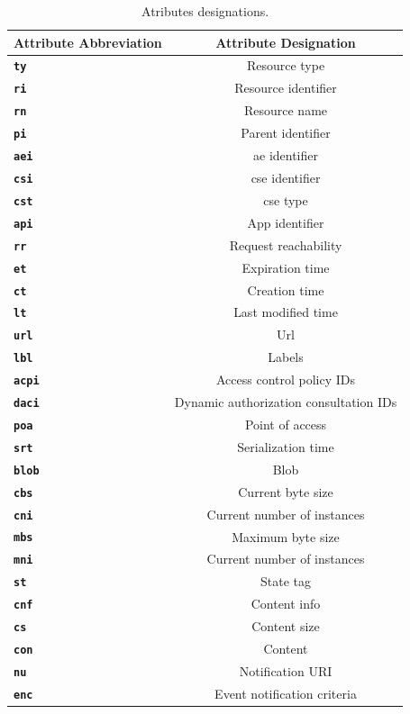 \documentclass[a4paper,fleqn]{cas-dc}
\begin{document}
\begin{table}[h]
	\scriptsize
	\caption{Atributes designations.}
	\label{tab:attributesDesignations}
	\begin{tabular}{ >{\bfseries}p{1.5cm} c }
		\hline
		\textbf{Attribute Abbreviation} & \textbf{Attribute Designation} \\
		\hline \hline
		\texttt{ty} & Resource type \\
		\texttt{ri} & Resource identifier \\
		\texttt{rn} & Resource name \\
		\texttt{pi} & Parent identifier \\
		\texttt{aei} & \gls{ae} identifier \\
		\texttt{csi} & \gls{cse} identifier \\
		\texttt{cst} & \gls{cse} type \\
		\texttt{api} & App identifier \\
		\texttt{rr} & Request reachability \\
		\texttt{et} & Expiration time \\
		\texttt{ct} & Creation time \\
		\texttt{lt} & Last modified time \\
		\texttt{url} & Url \\
		\texttt{lbl} & Labels \\
		\texttt{acpi} & Access control policy IDs \\
		\texttt{daci} & Dynamic authorization consultation IDs \\
		\texttt{poa} & Point of access \\
		\texttt{srt} & Serialization time \\
		\texttt{blob} & Blob \\
		\texttt{cbs} & Current byte size \\
		\texttt{cni} & Current number of instances \\
		\texttt{mbs} & Maximum byte size \\
		\texttt{mni} & Current number of instances \\
		\texttt{st} & State tag \\
		\texttt{cnf} & Content info \\
		\texttt{cs} & Content size \\
		\texttt{con} & Content \\
		\texttt{nu} & Notification URI \\
		\texttt{enc} & Event notification criteria \\
		\hline
	\end{tabular}
\end{table}
\end{document}
